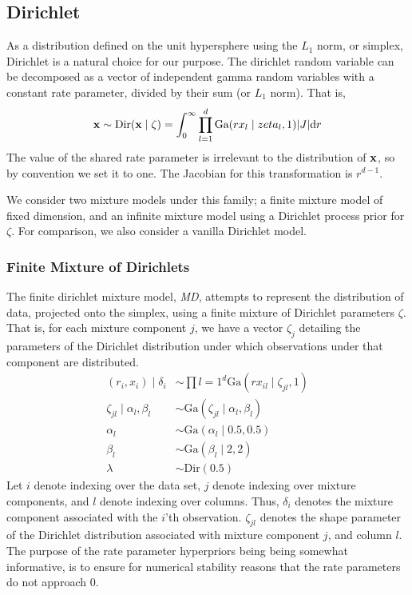 \subsection{Dirichlet}
As a distribution defined on the unit hypersphere using the $L_1$ norm, or simplex, Dirichlet is a
  natural choice for our purpose.  The dirichlet random variable can be decomposed as a vector of
  independent gamma random variables with a constant rate parameter, divided by their sum
  (or $L_1$ norm). That is,
  \begin{equation}
    \label{eq:dirichletrv}
    {\bf x} \sim \text{Dir}({\bf x} \mid \zeta) =
        \int_0^{\infty}\prod_{l = 1}^d\text{Ga}(rx_l \mid zeta_l, 1)\lvert J\rvert\text{d}r
  \end{equation}
  The value of the shared rate parameter is irrelevant to the distribution of ${\bf x}$, so by
  convention we set it to one.  The Jacobian for this transformation is $r^{d-1}$.

We consider two mixture models under this family; a finite mixture model of fixed dimension, and an
  infinite mixture model using a Dirichlet process prior for $\zeta$.  For comparison, we also
  consider a vanilla Dirichlet model.

\subsubsection{Finite Mixture of Dirichlets}
\label{model:md}
The finite dirichlet mixture model, \emph{MD}, attempts to represent the distribution of data, projected onto
  the simplex, using a finite mixture of Dirichlet parameters $\zeta$.  That is, for each mixture
  component $j$, we have a vector $\zeta_j$ detailing the parameters of the Dirichlet distribution
  under which observations under that component are distributed.
  \begin{equation}
    \label{eq:fmdirichlet}
    \begin{aligned}
      (r_i, x_i) \mid \delta_i &\sim \prod{l = 1}^d\text{Ga}(rx_{il}\mid \zeta_{jl}, 1)\\
            \zeta_{jl} \mid \alpha_l,\beta_l &\sim \text{Ga}(\zeta_{jl}\mid \alpha_l, \beta_l)\\
            \alpha_l &\sim \text{Ga}(\alpha_l \mid 0.5, 0.5)\\
            \beta_l &\sim \text{Ga}(\beta_l \mid 2, 2)\\
            \lambda &\sim \text{Dir}(0.5)
    \end{aligned}
  \end{equation}
  Let $i$ denote indexing over the data set, $j$ denote indexing over mixture components, and
  $l$ denote indexing over columns. Thus, $\delta_i$ denotes the mixture component associated
  with the $i$'th observation.  $\zeta_{jl}$ denotes the shape parameter of the Dirichlet
  distribution associated with mixture component $j$, and column $l$.  The purpose of the rate
  parameter hyperpriors being being somewhat informative, is to ensure for numerical stability
  reasons that the rate parameters do not approach 0.

